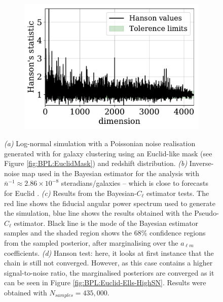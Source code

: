 \begin{figure}
\begin{subfigure}{.5\textwidth}
  \caption{}
  \label{fig:BPL:LN-HighSN-Cls}
\end{subfigure}
\begin{subfigure}{.5\textwidth}
  \centering
  \includegraphics[scale=0.50]{BPL-FIGS/Euclid-LN-PNoi-N32-HDens_Hanson.pdf}
  \caption{}
  \label{fig:BPL:LN-HighSN-Hanson}
\end{subfigure}
\caption[Bayesian-$C_{\ell}$ estimator tested on a Euclid-like \flask log-normal simulation with signal-to-noise similar to Euclid's.]{\textit{(a)} Log-normal simulation with a Poissonian noise realisation generated with \flask for galaxy clustering using an Euclid-like mask (see Figure \ref{fig:BPL:EuclidMask}) and redshift distribution. \textit{(b)} Inverse-noise map used in the Bayesian estimator for the analysis with $\bar{n}^{-1}\approx 2.86\times 10^{-8}$ steradians/galaxies -- which is close to forecasts for Euclid \citep{2011EuclidRedPaper,2017EuclidLSST}. \textit{(c)} Results from the Bayesian-$C_{\ell}$ estimator tests. The red line shows the fiducial angular power spectrum used to generate the simulation, blue line shows the results obtained with the Pseudo-$C_{\ell}$ estimator. Black line is the mode of the Bayesian estimator samples and the shaded region shows the 68\% confidence regions from the sampled posterior, after marginalising over the $a_{\ell m}$ coefficients. \textit{(d)} Hanson test: here, it looks at first instance that the chain is still not converged. However, as this case contains a higher signal-to-noise ratio, the marginalised posteriors are converged as it can be seen in Figure \ref{fig:BPL:Euclid-Ells-HighSN}. Results were obtained with $N_{samples} = 435,000$.}
\label{fig:BPL:LogNormalFSAnalysisHighSN}
\end{figure}

